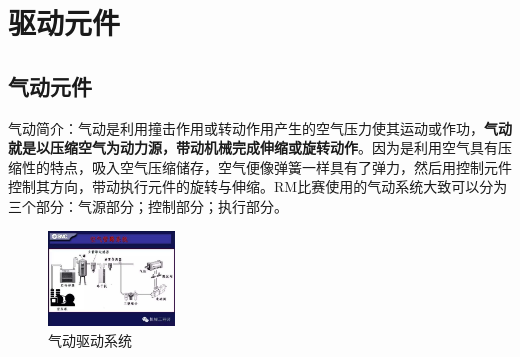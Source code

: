 \documentclass[UTF8]{article} %
\begin{document}
\section{驱动元件}

\subsection{气动元件}
气动简介：气动是利用撞击作用或转动作用产生的空气压力使其运动或作功，\textbf{气动就是以压缩空气为动力源，带动机械完成伸缩或旋转动作}。因为是利用空气具有压缩性的特点，吸入空气压缩储存，空气便像弹簧一样具有了弹力，然后用控制元件控制其方向，带动执行元件的旋转与伸缩。RM比赛使用的气动系统大致可以分为三个部分：气源部分；控制部分；执行部分。

\begin{figure}[h]
  \centering
  \includegraphics[width=0.3\textwidth]{qi1.png}
  \caption{气动驱动系统}
\end{figure}
\end{document}
